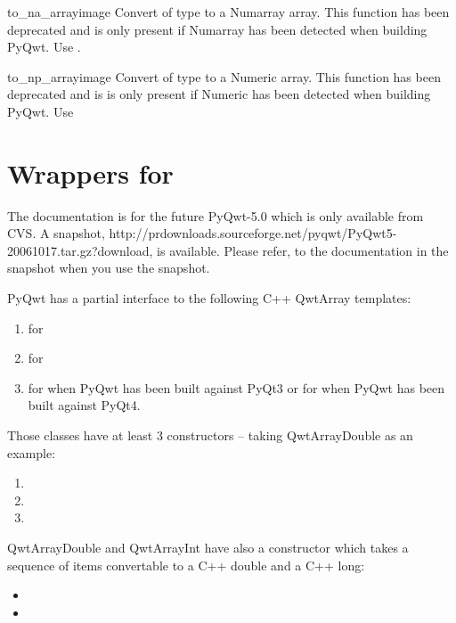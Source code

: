 \documentclass{manual}
\newcommand{\cvs}{20061017}
\newcommand{\PyQwtTarGz}{\ulink{PyQwt5-\cvs.tar.gz}
  {http://prdownloads.sourceforge.net/pyqwt/PyQwt5-\cvs.tar.gz?download}}
\newcommand{\Future}{
  \begin{notice}[warning]
    The documentation is for the future PyQwt-5.0 which is only available from
    CVS. A snapshot, \PyQwtTarGz{}, is available. Please refer, to the
    documentation in the snapshot when you use the snapshot.
  \end{notice}
}
\begin{document}
\begin{funcdesc}{to_na_array}{image}
  Convert  of type  to a Numarray array. This function
  has been deprecated and is only present if Numarray has been detected when
  building PyQwt.  Use .
\end{funcdesc}

\begin{funcdesc}{to_np_array}{image}
  Convert  of type  to a Numeric array. This function
  has been deprecated and is is only present if Numeric has been detected when
  building PyQwt. Use 
\end{funcdesc}



\section{Wrappers for  \label{qwtarray}}

\Future{}

PyQwt has a partial interface to the following C++ QwtArray templates:
\begin{enumerate}
\item
   for 
\item
   for 
\item
   for  when
  PyQwt has been built against PyQt3 or for  when
  PyQwt has been built against PyQt4.
\end{enumerate}

Those classes have at least 3 constructors -- taking QwtArrayDouble as an
example:
\begin{enumerate}
\item
\item
\item
\end{enumerate}

QwtArrayDouble and QwtArrayInt have also a constructor which takes a
sequence of items convertable to a C++ double and a C++ long:
\begin{itemize}
\item
\item
\end{itemize}
\end{document}
